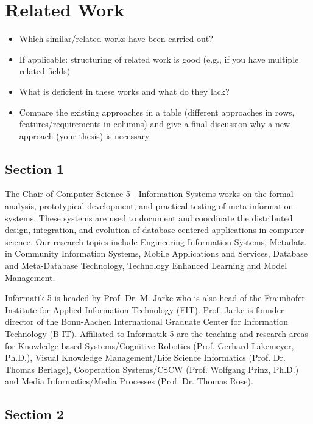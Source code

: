 \chapter{Related Work}
\label{cha:relwork}

\begin{itemize}
\item Which similar/related works have been carried out?
\item If applicable: structuring of related work is good (e.g., if you have multiple related fields)
\item What is deficient in these works and what do they lack?
\item Compare the existing approaches in a table (different approaches in rows, features/requirements in columns)
and give a final discussion why a new approach (your thesis) is necessary
\end{itemize}



\section{Section 1}


The Chair of Computer Science 5 - Information Systems works on the formal
analysis, prototypical development, and practical testing of meta-information
systems. These systems are used to document and coordinate the distributed
design, integration, and evolution of database-centered applications in computer
science. Our research topics include Engineering Information Systems, Metadata
in Community Information Systems, Mobile Applications and Services, Database and
Meta-Database Technology, Technology Enhanced Learning and Model Management.

Informatik 5 is headed by Prof. Dr. M. Jarke who is also head of the Fraunhofer
Institute for Applied Information Technology (FIT). Prof. Jarke is founder
director of the Bonn-Aachen International Graduate Center for Information
Technology (B-IT). Affiliated to Informatik 5 are the teaching and research
areas for Knowledge-based Systems/Cognitive Robotics (Prof. Gerhard Lakemeyer,
Ph.D.), Visual Knowledge Management/Life Science Informatics (Prof. Dr. Thomas
Berlage), Cooperation Systems/CSCW (Prof. Wolfgang Prinz, Ph.D.) and Media
Informatics/Media Processes (Prof. Dr. Thomas Rose).


\section{Section 2}


